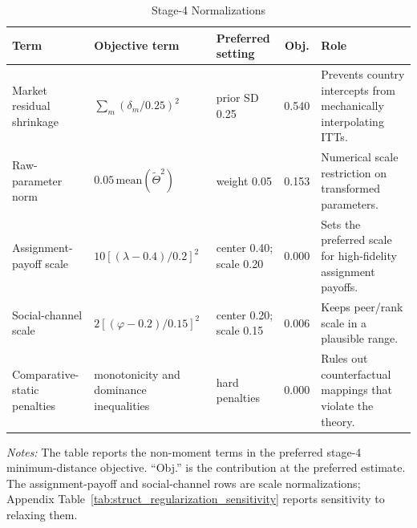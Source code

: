 \begin{table}[H]
\centering
\caption{Stage-4 Normalizations}
\label{tab:struct_stage4_normalizations}
\begin{threeparttable}
\scriptsize
\setlength{\tabcolsep}{3pt}
\begin{tabular}[t]{>{\raggedright\arraybackslash}p{2.5cm}>{\raggedright\arraybackslash}p{3.2cm}>{\raggedright\arraybackslash}p{2.8cm}c>{\raggedright\arraybackslash}p{4.7cm}}
\toprule
Term & Objective term & Preferred setting & Obj. & Role \\
\midrule
Market residual shrinkage & $\sum_m(\delta_m/0.25)^2$ & prior SD 0.25 & 0.540 & Prevents country intercepts from mechanically interpolating ITTs. \\
Raw-parameter norm & $0.05\,\mathrm{mean}(\tilde{\Theta}^2)$ & weight 0.05 & 0.153 & Numerical scale restriction on transformed parameters. \\
Assignment-payoff scale & $10[(\lambda-0.4)/0.2]^2$ & center 0.40; scale 0.20 & 0.000 & Sets the preferred scale for high-fidelity assignment payoffs. \\
Social-channel scale & $2[(\varphi-0.2)/0.15]^2$ & center 0.20; scale 0.15 & 0.006 & Keeps peer/rank scale in a plausible range. \\
Comparative-static penalties & monotonicity and dominance inequalities & hard penalties & 0.000 & Rules out counterfactual mappings that violate the theory. \\
\bottomrule
\end{tabular}
\begin{tablenotes}
\footnotesize
\item \textit{Notes:} The table reports the non-moment terms in the preferred stage-4 minimum-distance objective. ``Obj.'' is the contribution at the preferred estimate. The assignment-payoff and social-channel rows are scale normalizations; Appendix Table~\ref{tab:struct_regularization_sensitivity} reports sensitivity to relaxing them.
\end{tablenotes}
\end{threeparttable}
\end{table}
